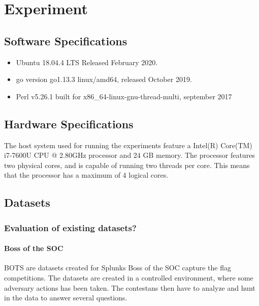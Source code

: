 \chapter{Experiment}
\label{chap:experiment}


\section{Software Specifications}
\label{sec:softwarespecs}

\begin{itemize}
    \item Ubuntu 18.04.4 LTS Released February 2020.
    \item go version go1.13.3 linux/amd64, released October 2019.
    \item Perl v5.26.1 built for x86\_64-linux-gnu-thread-multi, september 2017 
\end{itemize}

\section{Hardware Specifications}
\label{sec:hardwarespecs}
The host system used for running the experiments feature a Intel(R) Core(TM) i7-7600U CPU @ 2.80GHz processor and 24 GB memory. The processor features two physical cores, and is capable of running two threads per core. This means that the processor has a maximum of 4 logical cores.

\section{Datasets}
\label{sec:datasets}

\subsection{Evaluation of existing datasets?}

\subsubsection{Boss of the SOC}

BOTS are datasets created for Splunks Boss of the SOC capture the flag competitions. The datasets are created in a controlled environment, where some adversary actions has been taken. The contestans then have to analyze and hunt in the data to answer several questions.

